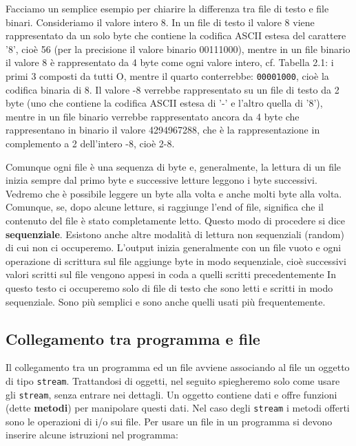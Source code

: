 \documentclass[a4paper,12pt]{book}
\begin{document}
Facciamo un semplice esempio per chiarire la differenza tra file di testo e file binari. Consideriamo il valore intero 8. In un file di testo il valore 8 viene rappresentato da un solo byte che contiene la codifica ASCII estesa del carattere '8', cioè 56 (per la precisione il valore binario 00111000), mentre in un file binario il valore 8 è rappresentato da 4 byte come ogni valore intero, cf. Tabella 2.1: i primi 3 composti da tutti O, mentre il quarto conterrebbe: \texttt{00001000}, cioè la codifica binaria di 8. Il valore -8 verrebbe rappresentato su un file di testo da 2 byte (uno che contiene la codifica ASCII estesa di '-' e l'altro quella di '8'), mentre in un file binario verrebbe rappresentato ancora da 4 byte che rappresentano in binario il valore 4294967288, che è la rappresentazione in complemento a 2 dell'intero -8, cioè 2-8.

Comunque ogni file è una sequenza di byte e, generalmente, la lettura di un file inizia sempre dal primo byte e successive letture leggono i byte successivi. Vedremo che è possibile leggere un byte alla volta e anche molti byte alla volta. Comunque, se, dopo alcune letture, si raggiunge l'end of file, significa che il contenuto del file è stato completamente letto. Questo modo di procedere si dice \textbf{sequenziale}. Esistono anche altre modalità di lettura non sequenziali (random) di cui non ci occuperemo. L'output inizia generalmente con un file vuoto e ogni operazione di scrittura sul file aggiunge byte in modo sequenziale, cioè successivi valori scritti sul file vengono appesi in coda a quelli scritti precedentemente In questo testo ci occuperemo solo di file di testo che sono letti e scritti in modo sequenziale. Sono più semplici e sono anche quelli usati più frequentemente.

\subsection{Collegamento tra programma e file}
Il collegamento tra un programma ed un file avviene associando al file un oggetto di tipo \texttt{stream}. Trattandosi di oggetti, nel seguito spiegheremo solo come usare gli \texttt{stream}, senza entrare nei dettagli. Un oggetto contiene dati e offre funzioni (dette \textbf{metodi}) per manipolare questi dati. Nel caso degli \texttt{stream} i metodi offerti sono le operazioni di i/o sui file. Per usare un file in un programma si devono inserire alcune istruzioni nel programma: 
\end{document}
